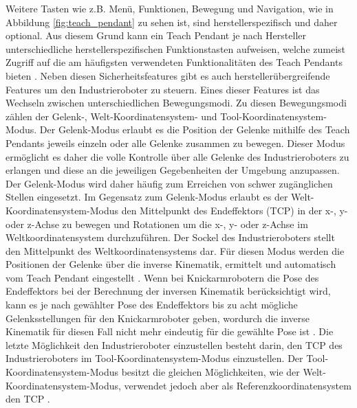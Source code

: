 Weitere Tasten wie z.B. Menü, Funktionen, Bewegung und Navigation, wie in Abbildung \ref{fig:teach_pendant} zu sehen ist, sind herstellerspezifisch und daher optional. Aus diesem Grund kann ein Teach Pendant je nach Hersteller unterschiedliche herstellerspezifischen Funktionstasten aufweisen, welche zumeist Zugriff auf die am häufigsten verwendeten Funktionalitäten des Teach Pendants bieten \cite{dinwiddie_basic_2015}. Neben diesen Sicherheitsfeatures gibt es auch herstellerübergreifende Features um den Industrieroboter zu steuern. Eines dieser Features ist das Wechseln zwischen unterschiedlichen Bewegungsmodi. Zu diesen Bewegungsmodi zählen der Gelenk-, Welt-Koordinatensystem- und Tool-Koordinatensystem-Modus. Der Gelenk-Modus erlaubt es die Position der Gelenke mithilfe des Teach Pendants jeweils einzeln oder alle Gelenke zusammen zu bewegen. Dieser Modus ermöglicht es daher die volle Kontrolle über alle Gelenke des Industrieroboters zu erlangen und diese an die jeweiligen Gegebenheiten der Umgebung anzupassen. Der Gelenk-Modus wird daher häufig zum Erreichen von schwer zugänglichen Stellen eingesetzt. Im Gegensatz zum Gelenk-Modus erlaubt es der Welt-Koordinatensystem-Modus den Mittelpunkt des Endeffektors (TCP) in der x-, y- oder z-Achse zu bewegen und Rotationen um die x-, y- oder z-Achse im Weltkoordinatensystem durchzuführen. Der Sockel des Industrieroboters stellt den Mittelpunkt des Weltkoordinatensystems dar. Für diesen Modus werden die Positionen der Gelenke über die inverse Kinematik, ermittelt und automatisch vom Teach Pendant eingestellt \cite{noauthor_jogging_2017}. Wenn bei Knickarmrobotern die Pose des Endeffektors bei der Berechnung der inversen Kinematik berücksichtigt wird, kann es je nach gewählter Pose des Endeffektors bis zu acht mögliche Gelenksstellungen für den Knickarmroboter geben, wordurch die inverse Kinematik für diesen Fall nicht mehr eindeutig für die gewählte Pose ist \cite[25]{pott_industrielle_2019}. Die letzte Möglichkeit den Industrieroboter einzustellen besteht darin, den TCP des Industrieroboters im Tool-Koordinatensystem-Modus einzustellen. Der Tool-Koordinatensystem-Modus besitzt die gleichen Möglichkeiten, wie der Welt-Koordinatensystem-Modus, verwendet jedoch aber als Referenzkoordinatensystem den TCP \cite{noauthor_jogging_2017}.





